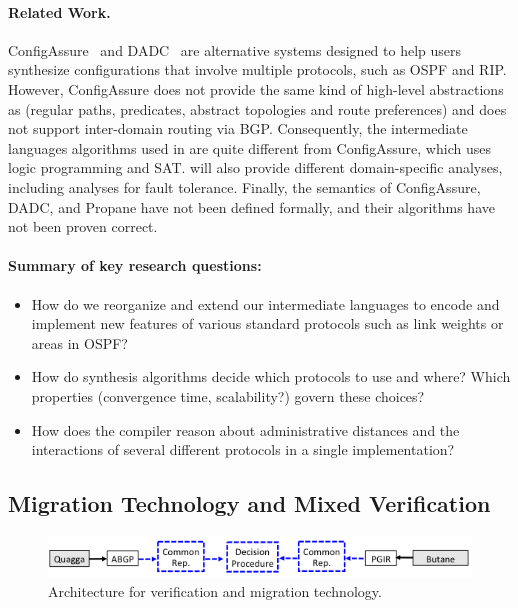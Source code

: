 \paragraph*{Related Work.}
ConfigAssure~\cite{narain:lisa05,narain+:configassure} and DADC~\cite{DADC} are alternative
systems designed to help users synthesize
configurations that involve multiple protocols, such as OSPF and RIP. 
However, ConfigAssure does not 
provide the same kind of high-level abstractions as \Name
(regular paths, predicates, abstract topologies and route preferences) and does not
support inter-domain routing via BGP.  Consequently,
the intermediate languages algorithms used in \Name are quite
different from ConfigAssure, which uses logic programming and SAT.
\Name will also provide different domain-specific analyses, including analyses for
fault tolerance.  Finally, the semantics of ConfigAssure, DADC, and Propane have not been defined formally,
and their algorithms have not been proven correct.

\paragraph*{Summary of key research questions:}

\begin{itemize}
\item How do we reorganize and extend our intermediate languages to encode and
implement new features of various standard protocols such as link weights
or areas in OSPF?  
\item How do synthesis algorithms decide which protocols to use and where?
Which properties (convergence time, scalability?) govern these choices?
\item How does the compiler reason about administrative distances
and the interactions of several different protocols in a single
implementation?
\end{itemize}

\subsection{Migration Technology and Mixed Verification}

\begin{figure}[t] 
  \centering
  \includegraphics[width=.9\textwidth]{figures/generic-equivalence}
\caption{Architecture for \Name verification and migration technology.}
\label{fig:transition-tech}
\end{figure}

